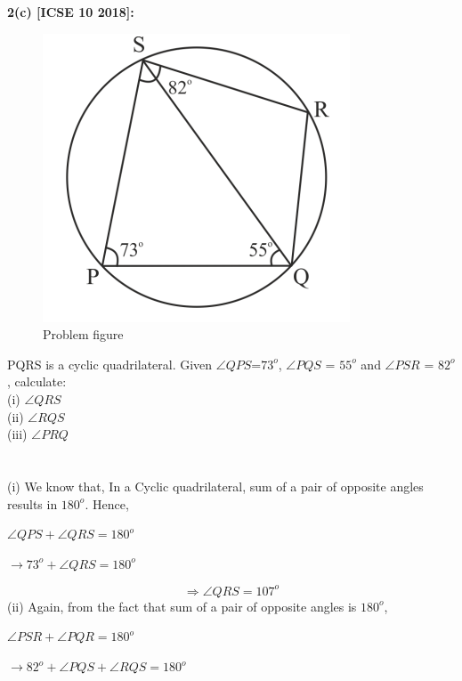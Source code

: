 \documentclass[journal,12pt,twocolumn]{IEEEtran}
\begin{document}
\textbf{2(c) [ICSE 10 2018]: }\\
\begin{center}
\begin{figure}[ht]
    \centering
    \includegraphics[scale = 0.5]{figs/fig1.png}
    \caption{Problem figure}
\end{figure}

\end{center}
PQRS is a cyclic quadrilateral. Given $\angle QPS$=$73^o$, $\angle PQS$ = $55^o$ and $\angle PSR$ = $82^o$, calculate:\\
(i) $\angle QRS$\\
(ii) $\angle RQS$\\
(iii) $\angle PRQ$\\\\
\solution\\
(i) We know that, In a Cyclic quadrilateral, sum of a pair of opposite angles results in $180^o$.
Hence,
\begin{center}
   $\angle QPS + \angle QRS = 180^o$
\end{center}
\begin{center}
$\rightarrow 73^o + \angle QRS = 180^o$
\end{center}
\begin{equation}
    \Rightarrow \angle QRS = 107^o
\end{equation}
(ii) Again, from the fact that sum of a pair of opposite angles is $180^o$,
\begin{center}
    $\angle PSR + \angle PQR = 180^o$
\end{center}
\begin{center}
    $\rightarrow 82^o + \angle PQS + \angle RQS = 180^o $
\end{center}
\end{document}
